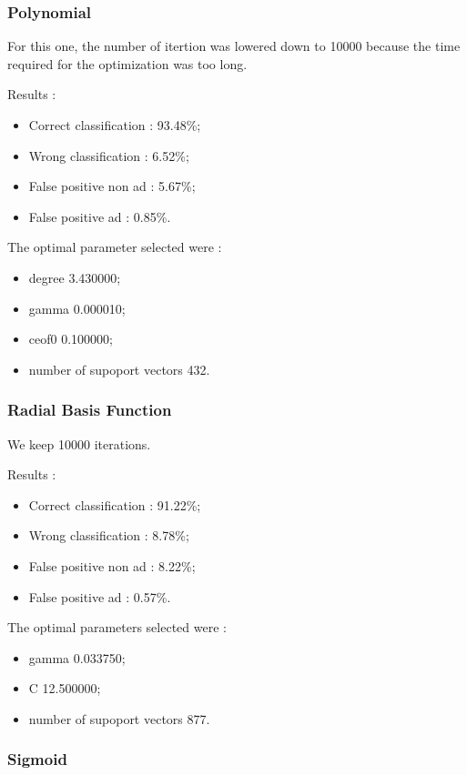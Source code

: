 \subsubsection{Polynomial}

For this one, the number of itertion was lowered down to 10000 because the time required for the optimization was too long.

Results :
\begin{itemize}
  \item Correct classification : 93.48\%;
  \item Wrong classification : 6.52\%;
  \item False positive non ad : 5.67\%;
  \item False positive ad : 0.85\%.
\end{itemize}

The optimal parameter selected were :
\begin{itemize}
  \item degree 3.430000;
  \item gamma 0.000010;
  \item ceof0 0.100000;
  \item number of supoport vectors 432.
\end{itemize}

\subsubsection{Radial Basis Function}

We keep 10000 iterations.

Results :
\begin{itemize}
  \item Correct classification : 91.22\%;
  \item Wrong classification : 8.78\%;
  \item False positive non ad : 8.22\%;
  \item False positive ad : 0.57\%.
\end{itemize}

The optimal parameters selected were :
\begin{itemize}
  \item gamma 0.033750;
  \item C 12.500000;
  \item number of supoport vectors 877.
\end{itemize}


\subsubsection{Sigmoid}

